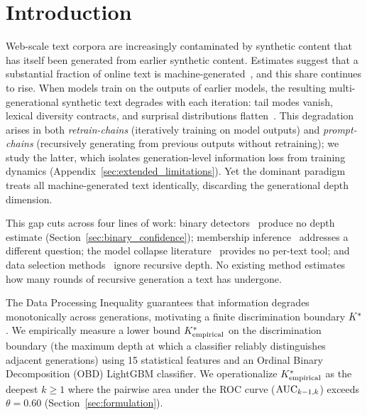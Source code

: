 \section{Introduction}
\label{sec:introduction}

Web-scale text corpora are increasingly contaminated by synthetic content that has itself been generated from earlier synthetic content.
Estimates suggest that a substantial fraction of online text is machine-generated~\cite{sun2025aigt, spennemann2025quantifying}, and this share continues to rise.
When models train on the outputs of earlier models, the resulting multi-generational synthetic text degrades with each iteration: tail modes vanish, lexical diversity contracts, and surprisal distributions flatten~\cite{shumailov2024collapse, dohmatob2024model}.
This degradation arises in both \emph{retrain-chains} (iteratively training on model outputs) and \emph{prompt-chains} (recursively generating from previous outputs without retraining); we study the latter, which isolates generation-level information loss from training dynamics (Appendix~\ref{sec:extended_limitations}).
Yet the dominant paradigm treats all machine-generated text identically, discarding the generational depth dimension.

This gap cuts across four lines of work: binary detectors~\cite{basani2026diveye, zhang2024minkpp} produce no depth estimate (Section~\ref{sec:binary_confidence}); membership inference~\cite{zawalski2026codec} addresses a different question; the model collapse literature~\cite{shumailov2024collapse, alemohammad2024selfconsuming, schaeffer2025position} provides no per-text tool; and data selection methods~\cite{xie2023dsir, tirumala2023d4, drayson2025} ignore recursive depth.
No existing method estimates how many rounds of recursive generation a text has undergone.

The Data Processing Inequality guarantees that information degrades monotonically across generations, motivating a finite discrimination boundary ${K^*}$.
We empirically measure a lower bound ${K^*_{\text{empirical}}}$ on the discrimination boundary (the maximum depth at which a classifier reliably distinguishes adjacent generations) using 15 statistical features and an Ordinal Binary Decomposition (OBD) LightGBM classifier.
We operationalize ${K^*_{\text{empirical}}}$ as the deepest $k \geq 1$ where the pairwise area under the ROC curve ($\text{AUC}_{k-1,k}$) exceeds $\theta = 0.60$ (Section~\ref{sec:formulation}).

